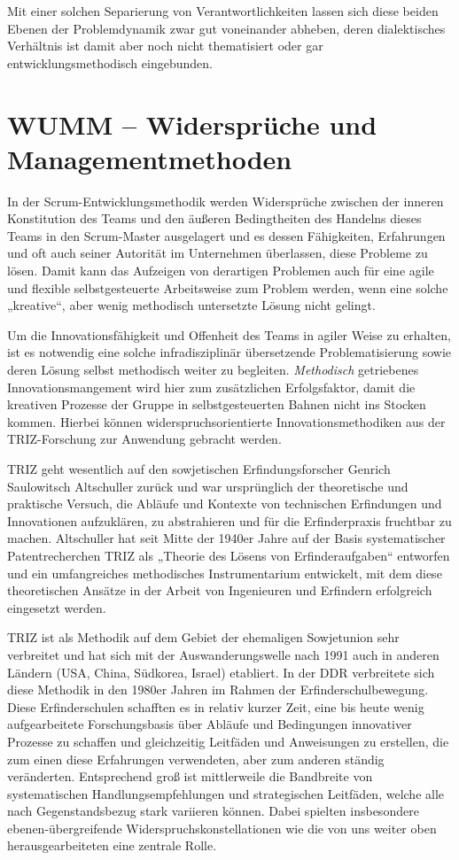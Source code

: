 \documentclass[a4paper,11pt]{article}
\begin{document}
Mit einer solchen Separierung von Verantwortlichkeiten lassen sich diese
beiden Ebenen der Problemdynamik zwar gut voneinander abheben, deren
dialektisches Verhältnis ist damit aber noch nicht thematisiert oder gar
entwicklungsmethodisch eingebunden.

\section*{WUMM – Widersprüche und Managementmethoden}

In der Scrum-Entwicklungsmethodik werden Widersprüche zwischen der inneren
Konstitution des Teams und den äußeren Bedingtheiten des Handelns dieses Teams
in den Scrum-Master ausgelagert und es dessen Fähigkeiten, Erfahrungen und oft
auch seiner Autorität im Unternehmen überlassen, diese Probleme zu
lösen. Damit kann das Aufzeigen von derartigen Problemen auch für eine agile
und flexible selbstgesteuerte Arbeitsweise zum Problem werden, wenn eine
solche „kreative“, aber wenig methodisch untersetzte Lösung nicht gelingt.

Um die Innovationsfähigkeit und Offenheit des Teams in agiler Weise zu
erhalten, ist es notwendig eine solche infradisziplinär übersetzende
Problematisierung sowie deren Lösung selbst methodisch weiter zu begleiten.
\emph{Methodisch} getriebenes Innovationsmangement wird hier zum zusätzlichen
Erfolgsfaktor, damit die kreativen Prozesse der Gruppe in selbstgesteuerten
Bahnen nicht ins Stocken kommen. Hierbei können widerspruchsorientierte
Innovationsmethodiken aus der TRIZ-Forschung zur Anwendung gebracht werden.

TRIZ geht wesentlich auf den sowjetischen Erfindungsforscher Genrich
Saulowitsch Altschuller zurück und war ursprünglich der theoretische und
praktische Versuch, die Abläufe und Kontexte von technischen Erfindungen und
Innovationen aufzuklären, zu abstrahieren und für die Erfinderpraxis fruchtbar
zu machen. Altschuller hat seit Mitte der 1940er Jahre auf der Basis
systematischer Patentrecherchen TRIZ als „Theorie des Lösens von
Erfinderaufgaben“ entworfen und ein umfangreiches methodisches Instrumentarium
entwickelt, mit dem diese theoretischen Ansätze in der Arbeit von Ingenieuren
und Erfindern erfolgreich eingesetzt werden.

TRIZ ist als Methodik auf dem Gebiet der ehemaligen Sowjetunion sehr
verbreitet und hat sich mit der Auswanderungswelle nach 1991 auch in anderen
Ländern (USA, China, Südkorea, Israel) etabliert. In der DDR verbreitete sich
diese Methodik in den 1980er Jahren im Rahmen der Erfinderschulbewegung. Diese
Erfinderschulen schafften es in relativ kurzer Zeit, eine bis heute wenig
aufgearbeitete Forschungsbasis über Abläufe und Bedingungen innovativer
Prozesse zu schaffen und gleichzeitig Leitfäden und Anweisungen zu erstellen,
die zum einen diese Erfahrungen verwendeten, aber zum anderen ständig
veränderten. Entsprechend groß ist mittlerweile die Bandbreite von
systematischen Handlungsempfehlungen und strategischen Leitfäden, welche alle
nach Gegenstandsbezug stark variieren können. Dabei spielten insbesondere
ebenen-übergreifende Widerspruchskonstellationen wie die von uns weiter oben
herausgearbeiteten eine zentrale Rolle.
\end{document}
